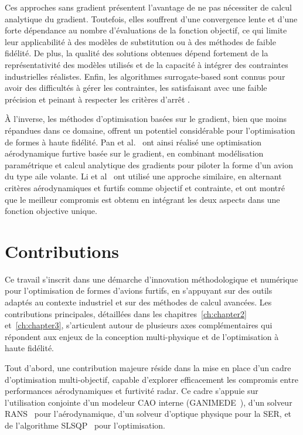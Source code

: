 Ces approches sans gradient présentent l'avantage de ne pas nécessiter de calcul analytique du gradient. Toutefois, elles souffrent d'une convergence lente et d'une forte dépendance au nombre d'évaluations de la fonction objectif, ce qui limite leur applicabilité à des modèles de substitution ou à des méthodes de faible fidélité. De plus, la qualité des solutions obtenues dépend fortement de la représentativité des modèles utilisés et de la capacité à intégrer des contraintes industrielles réalistes. Enfin, les algorithmes surrogate-based sont connus pour avoir des difficultés à gérer les contraintes, les satisfaisant avec une faible précision et peinant à respecter les critères d'arrêt \citep{Parr2010}.

À l'inverse, les méthodes d'optimisation basées sur le gradient, bien que moins répandues dans ce domaine, offrent un potentiel considérable pour l'optimisation de formes à haute fidélité. Pan et al.~\citep{Pan2017} ont ainsi réalisé une optimisation aérodynamique furtive basée sur le gradient, en combinant modélisation paramétrique et calcul analytique des gradients pour piloter la forme d'un avion du type aile volante. Li et al~\citep{Li2019} ont utilisé une approche similaire, en alternant critères aérodynamiques et furtifs comme objectif et contrainte, et ont montré que le meilleur compromis est obtenu en intégrant les deux aspects dans une fonction objective unique.

\section{Contributions}

Ce travail s'inscrit dans une démarche d'innovation méthodologique et numérique pour l'optimisation de formes d'avions furtifs, en s'appuyant sur des outils adaptés au contexte industriel et sur des méthodes de calcul avancées. Les contributions principales, détaillées dans les chapitres~\ref{ch:chapter2} et~\ref{ch:chapter3}, s'articulent autour de plusieurs axes complémentaires qui répondent aux enjeux de la conception multi-physique et de l'optimisation à haute fidélité.

Tout d'abord, une contribution majeure réside dans la mise en place d'un cadre d'optimisation multi-objectif, capable d'explorer efficacement les compromis entre performances aérodynamiques et furtivité radar. Ce cadre s'appuie sur l'utilisation conjointe d'un modeleur CAO interne (GANIMEDE~\citep{Kleinveld2008}), d'un solveur RANS~\citep{Chalot2004} pour l'aérodynamique, d'un solveur d'optique physique pour la SER, et de l'algorithme SLSQP~\citep{Barclay1999} pour l'optimisation.

